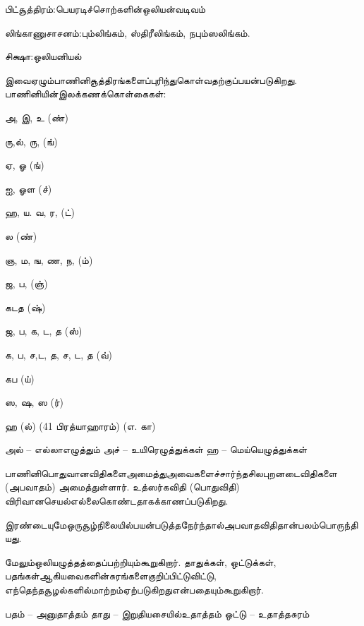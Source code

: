  \item பிட்சூத்திரம்:பெயரடிச்சொற்களின்ஒலியன்வடிவம்

 \item லிங்காணுசாசனம்:பும்லிங்கம், ஸ்திரீலிங்கம், நபும்ஸலிங்கம்.

 \item சிக்ஷா:ஒலியனியல்

இவைஏழும்பாணினிசூத்திரங்களைப்புரிந்துகொள்வதற்குப்பயன்படுகிறது. பாணினியின்இலக்கணக்கொள்கைகள்:

\item அ, இ, உ (ண்)

 \item ரு,ல், ரு, (ங்)

 \item ஏ, ஓ (ங்)

 \item ஐ, ஓள (ச்)

 \item ஹ, ய. வ, ர, (ட்) 

 \item ல (ண்)

 \item ஞ, ம, ங, ண, ந, (ம்)

 \item ஜ, ப, (ஞ்)

 \item கடத (ஷ்)

 \item ஜ, ப, க, ட, த (ஸ்)

 \item க, ப, ச,ட, த, ச, ட, த (வ்) 

 \item கப (ய்)

 \item ஸ, ஷ, ஸ (ர்)

 \item ஹ (ல்) (41 பிரத்யாஹாரம்) (எ. கா)

அல் – எல்லாஎழுத்தும் அச் – உயிரெழுத்துக்கள் ஹ – மெய்யெழுத்துக்கள்

பாணினிபொதுவானவிதிகளைஅமைத்துஅவைகளைச்சார்ந்தசிலபுறனடைவிதிகளை (அபவாதம்) அமைத்துள்ளார். உத்ஸர்கவிதி (பொதுவிதி) விரிவானசெயல்எல்லைகொண்டதாகக்காணப்படுகிறது.

இரண்டையுமேஒருசூழ்நிலையில்பயன்படுத்தநேர்ந்தால்அபவாதவிதிதான்பலம்பொருந்தியது.

மேலும்ஒலியழுத்தத்தைப்பற்றியும்கூறுகிறார். தாதுக்கள், ஒட்டுக்கள், பதங்கள்ஆகியவைகளின்சுரங்களைகுறிப்பிட்டுவிட்டு, எந்தெந்தசூழல்களில்மாற்றம்ஏற்படுகிறதுஎன்பதையும்கூறுகிறார்.

பதம் – அனுதாத்தம் தாது – இறுதியசையில்உதாத்தம் ஒட்டு – உதாத்தசுரம்

